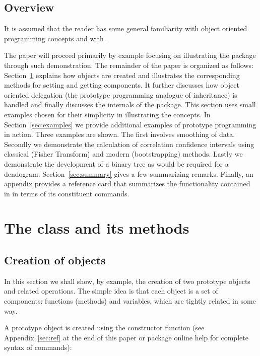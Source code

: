 \documentclass{Z}
\begin{document}
\subsection{Overview}

It is assumed that the reader has some general
familiarity with object oriented programming concepts and with
.

The paper will proceed primarily by example focusing on illustrating
the package  through such demonstration.  The remainder of
the paper is organized as follows: Section~\ref{sec:proto-class}
explains how  objects are created and illustrates the
corresponding methods for setting and getting components.  It further
discusses how object oriented delegation (the prototype programming
analogue of inheritance) is handled and finally discusses the
internals of the package.  This section uses small examples chosen for
their simplicity in illustrating the concepts.  In
Section~\ref{sec:examples} we provide additional examples of prototype
programming in action.  Three examples are shown.  The first involves
smoothing of data.  Secondly we demonstrate the calculation of
correlation confidence intervals using classical (Fisher Transform)
and modern (bootstrapping) methods.  Lastly we demonstrate the
development of a binary tree as would be required for a dendogram.
Section~\ref{sec:summary} gives a few summarizing remarks.  Finally,
an appendix provides a reference card that summarizes the
functionality contained in  in terms of its constituent
commands.

\pagebreak[4]

\section[The class ""proto" and its methods]{The class  and its methods}
\label{sec:proto-class}

\subsection[Creation of "proto" objects]{Creation of  objects}
\label{sec:proto}

In this section we shall show, by example, the creation of two
prototype objects and related operations.  The simple idea is that
each  object is a set of components: functions (methods)
and variables, which are tightly related in some way.

A prototype object is created using the constructor function
 (see Appendix~\ref{sec:ref} at the end of this paper or
 package online help for complete syntax of commands):
\end{document}
